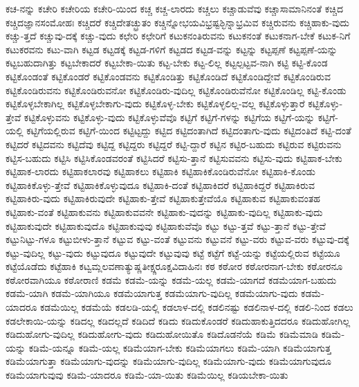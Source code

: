 {ಕಚ-ನನ್ನು
ಕಚೇರಿ
ಕಚೇರಿಯ
ಕಚೇರಿ-ಯಿಂದ
ಕಚ್ಚ
ಕಚ್ಚ-ಲಾರದು
ಕಚ್ಚಲು
ಕಚ್ಚಾಡುವೆವು
ಕಚ್ಚಾಸಾಮಾನಿನಂತೆ
ಕಚ್ಚಿದ
ಕಚ್ಚಿದಜ್ಞಾನಸಂಮೋಹಃ
ಕಚ್ಚಿದರೆ
ಕಚ್ಚಿದೇತಚ್ಛ್ರುತಂ
ಕಚ್ಚಿನ್ನೋಭಯವಿಭ್ರಷ್ಟಶ್ಛಿನ್ನಾಭ್ರಮಿವ
ಕಚ್ಚಿರುವನು
ಕಚ್ಚಿಹಾಕು-ವುದು
ಕಚ್ಚು-ತ್ತದೆ
ಕಚ್ಚುವು-ದಕ್ಕೆ
ಕಚ್ಚು-ವುದು
ಕಛೇರಿ
ಕಛೇರಿಗೆ
ಕಟುಕನಂತಿರುವನು
ಕಟುಕನಂತೆ
ಕಟುಕನಾಗ-ಬೇಕೆ
ಕಟುಕ-ನಿಗೆ
ಕಟುಕರವನು
ಕಟು-ವಾಗಿ
ಕಟ್ಟಡ
ಕಟ್ಟಡಕ್ಕೆ
ಕಟ್ಟಡ-ಗಳಿಗೆ
ಕಟ್ಟಡದ
ಕಟ್ಟಡ-ವನ್ನು
ಕಟ್ಟನ್ನು
ಕಟ್ಟಪ್ಪಣೆ
ಕಟ್ಟಪ್ಪಣೆ-ಯನ್ನು
ಕಟ್ಟಬಹುದಾಗಿತ್ತು
ಕಟ್ಟಬೇಕಾದರೆ
ಕಟ್ಟಬೇಕಾ-ಯಿತು
ಕಟ್ಟ-ಬೇಕು
ಕಟ್ಟ-ಲಿಲ್ಲ
ಕಟ್ಟಲ್ಪಟ್ಟವ-ನಾಗಿ
ಕಟ್ಟಿ
ಕಟ್ಟಿ-ಕೊಂಡ
ಕಟ್ಟಿಕೊಂಡಂತೆ
ಕಟ್ಟಿಕೊಂಡರೆ
ಕಟ್ಟಿಕೊಂಡವನು
ಕಟ್ಟಿಕೊಂಡಿತ್ತು
ಕಟ್ಟಿಕೊಂಡಿದೆ
ಕಟ್ಟಿಕೊಂಡಿದ್ದೇವೆ
ಕಟ್ಟಿಕೊಂಡಿರುವ
ಕಟ್ಟಿಕೊಂಡಿರುವನು
ಕಟ್ಟಿಕೊಂಡಿರುವನೋ
ಕಟ್ಟಿಕೊಂಡಿರು-ವುದಿಲ್ಲ
ಕಟ್ಟಿಕೊಂಡಿರುವೆನೋ
ಕಟ್ಟಿಕೊಂಡಿಲ್ಲ
ಕಟ್ಟಿ-ಕೊಂಡು
ಕಟ್ಟಿಕೊಳ್ಳಬೇಕಾಗಿಲ್ಲ
ಕಟ್ಟಿಕೊಳ್ಳಬೇಕಾಗು-ವುದು
ಕಟ್ಟಿಕೊಳ್ಳ-ಬೇಕು
ಕಟ್ಟಿಕೊಳ್ಳಲಿಲ್ಲ-ವಲ್ಲ
ಕಟ್ಟಿಕೊಳ್ಳುತ್ತಾರೆ
ಕಟ್ಟಿಕೊಳ್ಳು-ತ್ತೇವೆ
ಕಟ್ಟಿಕೊಳ್ಳುವನು
ಕಟ್ಟಿಕೊಳ್ಳು-ವುದು
ಕಟ್ಟಿಕೊಳ್ಳುವೆವೊ
ಕಟ್ಟಿಗೆ
ಕಟ್ಟಿಗೆ-ಗಳನ್ನು
ಕಟ್ಟಿಗೆಯ
ಕಟ್ಟಿಗೆ-ಯನ್ನು
ಕಟ್ಟಿಗೆ-ಯಲ್ಲಿ
ಕಟ್ಟಿಗೆಯಲ್ಲಿರುವ
ಕಟ್ಟಿಗೆ-ಯಿಂದ
ಕಟ್ಟಿಟ್ಟದ್ದು
ಕಟ್ಟಿದ
ಕಟ್ಟಿದಂತಾಗಿದೆ
ಕಟ್ಟಿದಂತಾಗು-ವುದು
ಕಟ್ಟಿದಂತಿದೆ
ಕಟ್ಟಿ-ದಂತೆ
ಕಟ್ಟಿದರೆ
ಕಟ್ಟಿದವನು
ಕಟ್ಟಿದೆವು
ಕಟ್ಟಿದ್ದ
ಕಟ್ಟಿದ್ದರು
ಕಟ್ಟಿದ್ದರೆ
ಕಟ್ಟಿ-ದ್ದಾರೆ
ಕಟ್ಟಿನ
ಕಟ್ಟಿರ-ಬಹುದು
ಕಟ್ಟಿರುವ
ಕಟ್ಟಿರುವನು
ಕಟ್ಟಿಸ-ಬಹುದು
ಕಟ್ಟಿಸಿ
ಕಟ್ಟಿಸಿಕೊಂಡವರಂತೆ
ಕಟ್ಟಿಸಿದರೆ
ಕಟ್ಟಿಸು-ತ್ತಾನೆ
ಕಟ್ಟಿಸುವವನು
ಕಟ್ಟಿಸು-ವುದು
ಕಟ್ಟಿಹಾಕ-ಬೇಕು
ಕಟ್ಟಿಹಾಕ-ಲಾರದು
ಕಟ್ಟಿಹಾಕಲಾರವು
ಕಟ್ಟಿಹಾಕಲು
ಕಟ್ಟಿಹಾಕಿ
ಕಟ್ಟಿಹಾಕಿಕೊಂಡಿರುವೆನೋ
ಕಟ್ಟಿಹಾಕಿ-ಕೊಂಡು
ಕಟ್ಟಿಹಾಕಿಕೊಳ್ಳು-ತ್ತೇವೆ
ಕಟ್ಟಿಹಾಕಿಕೊಳ್ಳುವುದೂ
ಕಟ್ಟಿಹಾಕಿ-ದಂತೆ
ಕಟ್ಟಿಹಾಕಿದರೆ
ಕಟ್ಟಿಹಾಕಿದ್ದರೆ
ಕಟ್ಟಿಹಾಕಿರುವ
ಕಟ್ಟಿಹಾಕಿರು-ವುದು
ಕಟ್ಟಿಹಾಕಿರುವುದೇ
ಕಟ್ಟಿಹಾಕು-ತ್ತೇವೆ
ಕಟ್ಟಿಹಾಕುತ್ತೇವೆಯೊ
ಕಟ್ಟಿಹಾಕುವ
ಕಟ್ಟಿಹಾಕುವಂತಹ
ಕಟ್ಟಿಹಾಕು-ವಂತೆ
ಕಟ್ಟಿಹಾಕುವನು
ಕಟ್ಟಿಹಾಕುವವನೇ
ಕಟ್ಟಿಹಾಕು-ವುದನ್ನು
ಕಟ್ಟಿಹಾಕು-ವುದಿಲ್ಲ
ಕಟ್ಟಿಹಾಕು-ವುದು
ಕಟ್ಟಿಹಾಕುವುದೇ
ಕಟ್ಟಿಹಾಕುವುದೊ
ಕಟ್ಟಿಹಾಕುವುವು
ಕಟ್ಟಿಹಾಕುವೆವೊ
ಕಟ್ಟು
ಕಟ್ಟು-ತ್ತವೆ
ಕಟ್ಟು-ತ್ತಾನೆ
ಕಟ್ಟು-ತ್ತೇವೆ
ಕಟ್ಟುನಿಟ್ಟು-ಗಳೂ
ಕಟ್ಟುಬೀಳು-ತ್ತಾನೆ
ಕಟ್ಟುವ
ಕಟ್ಟು-ವಂತೆ
ಕಟ್ಟುವನು
ಕಟ್ಟುವನೆ
ಕಟ್ಟು-ವರು
ಕಟ್ಟುವ-ವರು
ಕಟ್ಟುವು-ದಕ್ಕೆ
ಕಟ್ಟು-ವುದಿಲ್ಲ
ಕಟ್ಟು-ವುದು
ಕಟ್ಟುವುದೂ
ಕಟ್ಟುವುದೇ
ಕಟ್ಟುವುವು
ಕಟ್ಟೆ
ಕಟ್ಟೆಗೆ
ಕಟ್ಟೆ-ಯನ್ನು
ಕಟ್ಟೆಯಲ್ಲಿರುವ
ಕಟ್ಟೆಯೂ
ಕಟ್ಟೆಯೊಡೆದು
ಕಟ್ಟೆಹಾಕಿ
ಕಟ್ವಮ್ಲಲವಣಾತ್ಯುಷ್ಣತೀಕ್ಷ್ಣರೂಕ್ಷವಿದಾಹಿನಃ
ಕಠ
ಕಠೋರ
ಕಠೋರನಾಗ-ಬೇಕು
ಕಠೋರನೂ
ಕಠೋರವಾಗಿಯೂ
ಕಠೋರಾಣಿ
ಕಡಮೆ
ಕಡಮೆ-ಯನ್ನು
ಕಡಮೆ-ಯಲ್ಲ
ಕಡಮೆ-ಯಾಗದೆ
ಕಡಮೆಯಾಗ-ಬಹುದು
ಕಡಮೆ-ಯಾಗಿ
ಕಡಮೆ-ಯಾಗಿಯೂ
ಕಡಮೆಯಾಗುತ್ತ
ಕಡಮೆಯಾಗು-ವುದಿಲ್ಲ
ಕಡಮೆಯಾಗು-ವುದು
ಕಡಮೆ-ಯಾದರೂ
ಕಡಮೆಯಿಲ್ಲ
ಕಡಮೆಯೆ
ಕಡಲಡಿ-ಯಲ್ಲಿ
ಕಡಲಾಳ-ದಲ್ಲಿ
ಕಡಲಿನಷ್ಟು
ಕಡಲಿನಾಳ-ದಲ್ಲಿ
ಕಡಲಿ-ನಿಂದ
ಕಡಲು
ಕಡಲೇಕಾಯಿ-ಯನ್ನು
ಕಡಿದಲ್ಲ
ಕಡಿದಲ್ಲದೆ
ಕಡಿದಿದೆ
ಕಡಿದು
ಕಡಿದುಕೊಂಡರೆ
ಕಡಿದುಹಾಕುತ್ತಿದದರೂ
ಕಡಿದುಹೋಗಿಲ್ಲ
ಕಡಿದುಹೋಗು-ವುದಿಲ್ಲ
ಕಡಿದುಹೋಗು-ವುದು
ಕಡಿದುಹೋಯಿತೊ
ಕಡಿದೊಡನೆಯೆ
ಕಡಿಮೆ
ಕಡಿಮೆಮಾಡಿ
ಕಡಿಮೆ-ಯನ್ನು
ಕಡಿಮೆ-ಯನ್ನೂ
ಕಡಿಮೆ-ಯಲ್ಲ
ಕಡಿಮೆಯಾಗ-ಬೇಕು
ಕಡಿಮೆಯಾಗಲು
ಕಡಿಮೆ-ಯಾಗಿ
ಕಡಿಮೆಯಾಗುತ್ತ
ಕಡಿಮೆಯಾಗುತ್ತಾ
ಕಡಿಮೆಯಾಗು-ವುದನ್ನು
ಕಡಿಮೆಯಾಗು-ವುದಿಲ್ಲ
ಕಡಿಮೆಯಾಗು-ವುದು
ಕಡಿಮೆಯಾಗುವುದೂ
ಕಡಿಮೆಯಾಗುವುವು
ಕಡಿಮೆ-ಯಾದರೂ
ಕಡಿಮೆ-ಯಾ-ಯಿತು
ಕಡಿಮೆಯಿಲ್ಲ
ಕಡಿಯಬೇಕಾ-ಯಿತು
}
